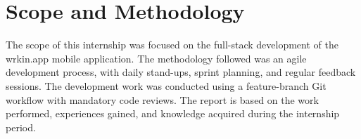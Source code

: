 \section{Scope and Methodology}
The scope of this internship was focused on the full-stack development of the wrkin.app mobile application. The methodology followed was an agile development process, with daily stand-ups, sprint planning, and regular feedback sessions. The development work was conducted using a feature-branch Git workflow with mandatory code reviews. The report is based on the work performed, experiences gained, and knowledge acquired during the internship period.